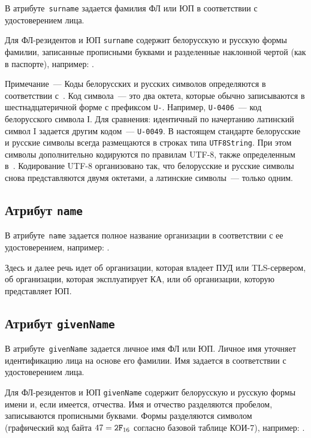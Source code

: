В атрибуте~\texttt{surname} задается фамилия ФЛ или ЮП
в соответствии с удостоверением лица.

Для ФЛ-резидентов и ЮП \texttt{surname} содержит белорусскую и русскую 
формы фамилии, записанные прописными буквами и разделенные 
наклонной чертой (как в паспорте), например: .

\begin{note} 
Примечание~--- Коды белорусских и русских символов определяются 
в соответствии с~\cite{UTF8}. Код символа~--- это два октета,
которые обычно записываются в шестнадцатеричной форме с префиксом
\texttt{U-}. Например, \texttt{U-0406}~--- код белорусского символа І.
Для сравнения: идентичный по начертанию латинский символ I 
задается другим кодом~--- \texttt{U-0049}.
%
В настоящем стандарте белорусские и русские символы 
всегда размещаются в строках типа \texttt{UTF8String}.
%
При этом символы дополнительно кодируются по правилам UTF-8, также 
определенным в~\cite{UTF8}. Кодирование UTF-8 организовано так, что 
белорусские и русские символы снова представляются двумя октетами, 
а латинские символы~--- только одним.
\end{note}

\subsection{Атрибут \texttt{name}}\label{ENTITIES.Id.N}

В атрибуте~\texttt{name} задается полное название организации
в соответствии с ее удостоверением, например: 
.

Здесь и далее речь идет об организации,
которая владеет ПУД или TLS-сервером, 
об организации, которая эксплуатирует КА,
или об организации, которую представляет ЮП.

\subsection{Атрибут \texttt{givenName}}\label{ENTITIES.Id.GN}

В атрибуте~\texttt{givenName} задается личное имя ФЛ или ЮП.
Личное имя уточняет идентификацию лица на основе его фамилии.
%
Имя задается в соответствии с удостоверением лица. 

Для ФЛ-резидентов и ЮП \texttt{givenName} содержит белорусскую и русскую 
формы имени и, если имеется, отчества. Имя и отчество 
разделяются пробелом, записываются прописными буквами.
%
Формы разделяются символом~\str{/} (графический код 
байта $47=\texttt{2F}_{16}$ согласно базовой таблице КОИ-7),
например: .

